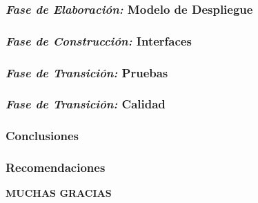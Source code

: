 \documentclass[xcolor=dvipsnames]{beamer}
\begin{document}
\begin{frame}
    \frametitle{\textit{Fase de Elaboración:} Modelo de Despliegue}
\end{frame}

\begin{frame}
    \frametitle{\textit{Fase de Construcción:} Interfaces}
\end{frame}

\begin{frame}
    \frametitle{\textit{Fase de Transición:} Pruebas}
\end{frame}

\begin{frame}
    \frametitle{\textit{Fase de Transición:} Calidad}
\end{frame}

\begin{frame}
    \frametitle{Conclusiones}
\end{frame}

\begin{frame}
    \frametitle{Recomendaciones}
\end{frame}

\begin{frame}
    \centering\textbf{\huge{\textcolor{color1}{MUCHAS GRACIAS}}}    
\end{frame}
\end{document}
